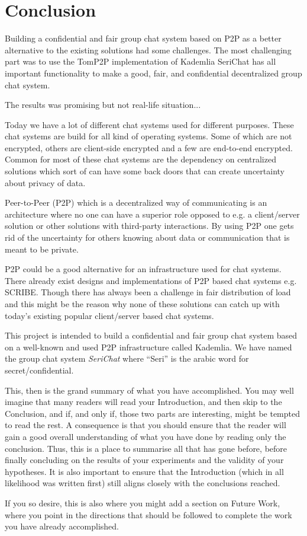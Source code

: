 \chapter{Conclusion}
\label{cha:conclusion}
Building a confidential and fair group chat system based on P2P as a better alternative to the existing solutions had some challenges. 
The most challenging part was to use the TomP2P implementation of Kademlia 
SeriChat has all important functionality to make a good, fair, and confidential decentralized group chat system.   
 
The results was promising but not real-life situation...




Today we have a lot of different chat systems used for different purposes. These chat systems are build for all kind of operating systems. 
Some of which are not encrypted, others are client-side encrypted and a few are end-to-end encrypted. Common for most of these chat systems are the dependency on centralized solutions which sort of can have some back doors that can create uncertainty about privacy of data. 

Peer-to-Peer (P2P) which is a decentralized way of communicating is an architecture where no one can have a superior role opposed to e.g. a client/server solution or other solutions with third-party interactions. By using P2P one gets rid of the uncertainty for others knowing about data or communication that is meant to be private. 

P2P could be a good alternative for an infrastructure used for chat systems. There already exist designs and implementations of P2P based chat systems e.g. SCRIBE. Though there has always been a challenge in fair distribution of load and this might be the reason why none of these solutions can catch up with today's existing popular client/server based chat systems.  

This project is intended to build a confidential and fair group chat system based on a well-known and used P2P infrastructure called Kademlia. We have named the group chat system \emph{SeriChat} where ``Seri'' is the arabic word for secret/confidential. 









This, then is the grand summary of what you have accomplished.  You
may well imagine that many readers will read your Introduction, and
then skip to the Conclusion, and if, and only if, those two parts are
interesting, might be tempted to read the rest. A consequence is that
you should ensure that the reader will gain a good overall
understanding of what you have done by reading only the conclusion.
Thus, this is a place to summarise all that has gone before, before
finally concluding on the results of your experiments and the validity
of your hypotheses. It is also important to ensure that the
Introduction (which in all likelihood was written first) still aligns
closely with the conclusions reached.

If you so desire, this is also where you might add a section on Future
Work, where you point in the directions that should be followed to
complete the work you have already accomplished.

